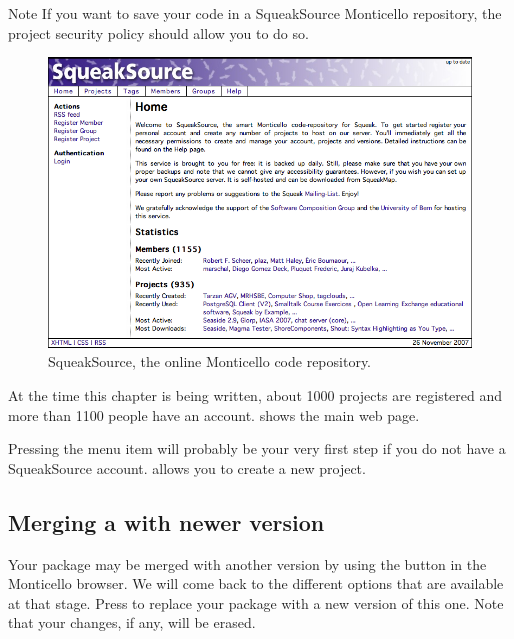 \documentclass[a4paper,10pt,twoside]{book}
\begin{document}
Note If you want to save your code in a SqueakSource Monticello repository, the project security policy should allow you to do so.


\begin{figure}[ht]\centering
	\includegraphics[width=.75\linewidth]{squeaksource2}
	\caption{SqueakSource, the online Monticello code repository.}
\end{figure}

At the time this chapter is being written, about 1000 projects are registered and more than 1100 people have an account.  shows the main web page.

Pressing the  menu item will probably be your very first step if you do not have a SqueakSource account.  allows you to create a new project. 

\subsection{Merging a with newer version}

Your package may be merged with another version by using the  button in the Monticello browser. We will come back to the different options that are available at that stage. Press  to replace your package with a new version of this one. Note that your changes, if any, will be erased.
\end{document}
